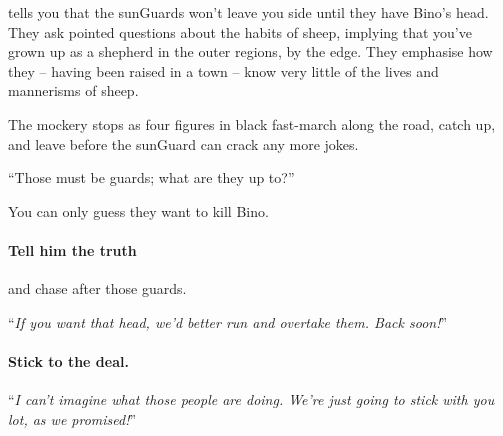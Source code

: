 tells you that the \glspl{sunGuard} won't leave you side until they have Bino's head.
They ask pointed questions about the habits of sheep, implying that you've grown up as a shepherd in the outer regions, by the \gls{edge}.
They emphasise how they -- having been raised in a town -- know very little of the lives and mannerisms of sheep.

The mockery stops as four figures in black fast-march along the road, catch up, and leave before the \gls{sunGuard} can crack any more jokes.

\begin{speechtext}
  ``Those must be \glspl{guard}; what are they up to?''
\end{speechtext}

You can only guess they want to kill Bino.

\paragraph{Tell him the truth}
and chase after those \glspl{guard}.

``\textit{If you want that head, we'd better run and overtake them.
Back soon!}''

\paragraph{Stick to the deal.}
``\textit{I can't imagine what those people are doing.
We're just going to stick with you lot, as we promised!}''
